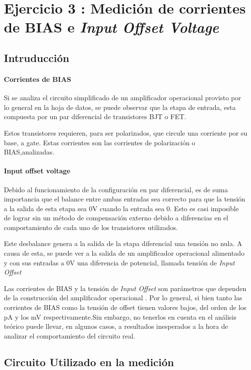 
\section{Ejercicio 3 : Medici\'on de corrientes de BIAS e \textit{Input Offset Voltage}}
\subsection{Intruducci\'on}
\paragraph{Corrientes de BIAS}
Si se analiza el circuito simplificado de un amplificador operacional provisto por lo general en la hoja de datos, se puede observar que la etapa de entrada, esta compuesta por un par diferencial de transistores BJT o FET. 

Estos transistores requieren, para ser polarizados, que circule una corriente por su base, a gate. Estas corrientes son las corrientes de polarizaci\'on o BIAS,analizadas. 
 
\paragraph{Input offset voltage}
Debido al funcionamiento de la configuraci\'on en par diferencial, es de suma importancia que el balance entre ambas entradas sea correcto para que la tensi\'on a la salida de esta etapa sea 0V cuando la entrada sea 0. Esto es casi imposible de lograr sin un m\'etodo de compensaci\'on externo debido a diferencias en el comportamiento de cada uno de los transistores utilizados. 

Este desbalance genera a la salida de la etapa diferencial una tensi\'on no nula. A causa de esta, se puede ver a la salida de un amplificador operacional alimentado y con sus entradas a 0V una diferencia de potencial, llamada tensi\'on de \textit{Input Offset}

 
 
\noindent Las corrientes de  BIAS y la tensi\'on de \textit{Input Offset} son par\'ametros que dependen de la construcci\'on del amplificador operacional . Por lo general, si bien tanto las corrientes de BIAS como la tensi\'on de offset tienen valores bajos, del orden de los pA y los mV respectivamente.Sin embargo, no tenerlos en cuenta en el an\'alisis te\'orico puede llevar, en algunos casos, a resultados inesperados a la hora de analizar el comportamiento del circuito real.


\subsection{Circuito Utilizado en la medici\'on}

